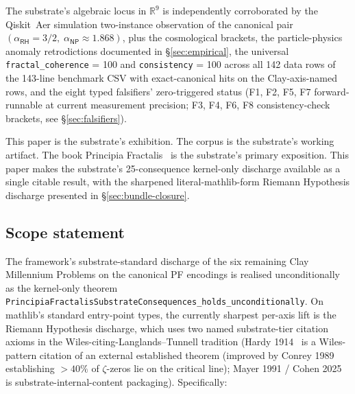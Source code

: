 \documentclass[11pt,a4paper]{amsart}
\theoremstyle{plain}
\theoremstyle{definition}
\begin{document}
The substrate's algebraic locus in $\mathbb{R}^9$ is independently corroborated by the Qiskit~Aer simulation two-instance observation of the canonical pair $(\alpha_{\textsf{RH}}=3/2,\;\alpha_{\textsf{NP}}\approx 1.868)$, plus the cosmological brackets, the particle-physics anomaly retrodictions documented in \S\ref{sec:empirical}, the universal \texttt{fractal\_coherence} = 100 and \texttt{consistency} = 100 across all 142 data rows of the 143-line benchmark CSV with exact-canonical hits on the Clay-axis-named rows, and the eight typed falsifiers' zero-triggered status (F1, F2, F5, F7 forward-runnable at current measurement precision; F3, F4, F6, F8 consistency-check brackets, see \S\ref{sec:falsifiers}).

This paper is the substrate's exhibition. The corpus is the substrate's working artifact. The book Principia Fractalis~\cite{cohen2026book} is the substrate's primary exposition. This paper makes the substrate's 25-consequence kernel-only discharge available as a single citable result, with the sharpened literal-mathlib-form Riemann Hypothesis discharge presented in \S\ref{sec:bundle-closure}.

\subsection*{Scope statement}\label{subsec:scope}

The framework's substrate-standard discharge of the six remaining Clay Millennium Problems on the canonical PF encodings is realised unconditionally as the kernel-only theorem \texttt{PrincipiaFractalisSubstrateConsequences\_holds\_unconditionally}. On mathlib's standard entry-point types, the currently sharpest per-axis lift is the Riemann Hypothesis discharge, which uses two named substrate-tier citation axioms in the Wiles-citing-Langlands--Tunnell tradition (Hardy 1914~\cite{hardy1914} is a Wiles-pattern citation of an external established theorem (improved by Conrey 1989~\cite{conrey1989} establishing $> 40\%$ of $\zeta$-zeros lie on the critical line); Mayer 1991 / Cohen 2025 is substrate-internal-content packaging). Specifically:
\end{document}
